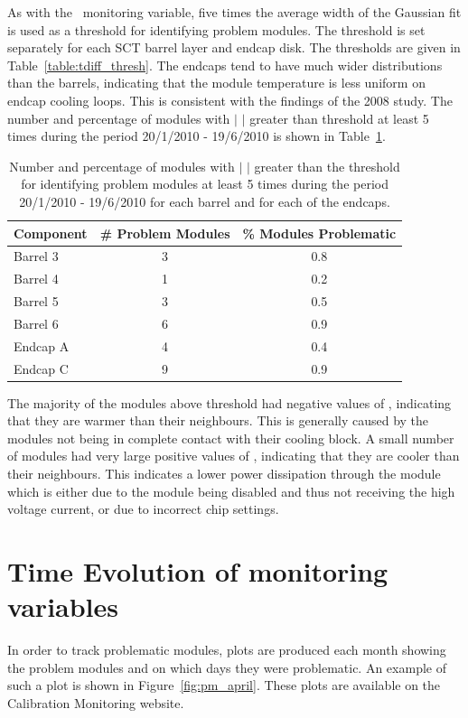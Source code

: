 As with the \deltat\ monitoring variable, five times the average width of the
Gaussian fit is used as a threshold for identifying problem modules. The
threshold is set separately for each SCT barrel layer and endcap disk. The
thresholds are given in Table~\ref{table:tdiff_thresh}. The endcaps tend to have
much wider distributions than the barrels, indicating that the module
temperature is less uniform on endcap cooling loops. This is consistent with the
findings of the 2008 study. The number and percentage of modules with $|$
\tdiff$|$ greater than threshold at least 5 times during the period 20/1/2010 -
19/6/2010 is shown in Table~\ref{table:tdiff_num}.

\begin{table}
 \centering
\begin{tabular}{  l | c | c }
\hline\hline
Component & \# Problem Modules & \% Modules Problematic \\
\hline
Barrel 3 & 3 & 0.8 \\
Barrel 4 & 1 & 0.2 \\
Barrel 5 & 3 & 0.5 \\
Barrel 6 & 6 & 0.9 \\
Endcap A & 4 & 0.4 \\
Endcap C & 9 & 0.9 \\
\hline\hline
 \end{tabular}
\caption{Number and percentage of modules with $|$ \tdiff$|$ greater than the
threshold for identifying problem modules at least 5 times during the period
20/1/2010 - 19/6/2010 for each barrel and for each of the endcaps.}
\label{table:tdiff_num}
\end{table}

The majority of the modules above threshold had negative values of \tdiff,
indicating that they are warmer than their neighbours. This is generally caused
by the modules not being in complete contact with their cooling block. A small
number of modules had very large positive values of \tdiff, indicating that they
are cooler than their neighbours. This indicates a lower power dissipation
through the module which is either due to the module being disabled and thus not
receiving the high voltage current, or due to incorrect chip settings.

\section{Time Evolution of monitoring variables}

In order to track problematic modules, plots are produced each month showing the
problem modules and on which days they were problematic. An example of such a
plot is shown in Figure~\ref{fig:pm_april}. These plots are available on the
Calibration Monitoring website.

